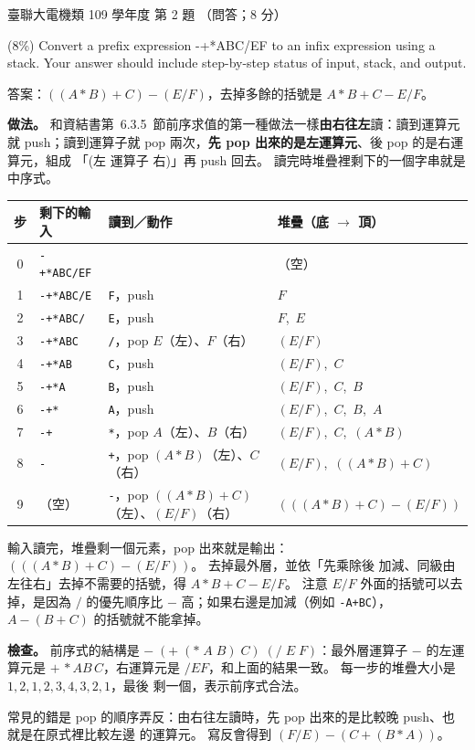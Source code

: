 \begin{pastexam}[label={px:ust-109-ee-ds-02}]{臺聯大電機類 109 學年度 第 2 題}
（問答；8 分）

(8\%) Convert a prefix expression -+*ABC/EF to an infix expression using a stack. Your answer
should include step-by-step status of input, stack, and output.
\end{pastexam}

\begin{pastsoln}
答案：$((A*B)+C)-(E/F)$，去掉多餘的括號是 $A*B+C-E/F$。

\textbf{做法。} 和資結書第~6.3.5~節前序求值的第一種做法一樣\textbf{由右往左}讀：讀到運算元
就 push；讀到運算子就 pop 兩次，\textbf{先 pop 出來的是左運算元}、後 pop 的是右運算元，組成
「(左 運算子 右)」再 push 回去。 讀完時堆疊裡剩下的一個字串就是中序式。

\begin{center}
\small
\begin{tabular}{clll}
\toprule
步 & 剩下的輸入 & 讀到／動作 & 堆疊（底 $\to$ 頂） \\
\midrule
0 & \texttt{-+*ABC/EF} & & （空） \\
1 & \texttt{-+*ABC/E} & \texttt{F}，push & $F$ \\
2 & \texttt{-+*ABC/} & \texttt{E}，push & $F$,\ $E$ \\
3 & \texttt{-+*ABC} & \texttt{/}，pop $E$（左）、$F$（右） & $(E/F)$ \\
4 & \texttt{-+*AB} & \texttt{C}，push & $(E/F)$,\ $C$ \\
5 & \texttt{-+*A} & \texttt{B}，push & $(E/F)$,\ $C$,\ $B$ \\
6 & \texttt{-+*} & \texttt{A}，push & $(E/F)$,\ $C$,\ $B$,\ $A$ \\
7 & \texttt{-+} & \texttt{*}，pop $A$（左）、$B$（右） & $(E/F)$,\ $C$,\ $(A*B)$ \\
8 & \texttt{-} & \texttt{+}，pop $(A*B)$（左）、$C$（右） & $(E/F)$,\ $((A*B)+C)$ \\
9 & （空） & \texttt{-}，pop $((A*B)+C)$（左）、$(E/F)$（右） & $(((A*B)+C)-(E/F))$ \\
\bottomrule
\end{tabular}
\end{center}
輸入讀完，堆疊剩一個元素，pop 出來就是輸出：$(((A*B)+C)-(E/F))$。 去掉最外層，並依「先乘除後
加減、同級由左往右」去掉不需要的括號，得 $A*B+C-E/F$。 注意 $E/F$ 外面的括號可以去掉，是因為
$/$ 的優先順序比 $-$ 高；如果右邊是加減（例如 \texttt{-A+BC}），$A-(B+C)$ 的括號就不能拿掉。

\textbf{檢查。} 前序式的結構是 $-\;(+\;(*\;A\;B)\;C)\;(/\;E\;F)$：最外層運算子 $-$ 的左運算元是
$+\,{*}AB\,C$，右運算元是 $/EF$，和上面的結果一致。 每一步的堆疊大小是 $1,2,1,2,3,4,3,2,1$，最後
剩一個，表示前序式合法。

常見的錯是 pop 的順序弄反：由右往左讀時，先 pop 出來的是比較晚 push、也就是在原式裡比較左邊
的運算元。 寫反會得到 $(F/E)-(C+(B*A))$。
\end{pastsoln}
